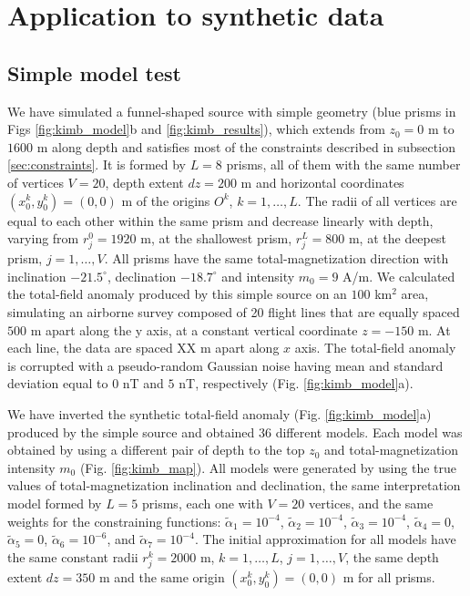 \section{Application to synthetic data}

\subsection{Simple model test}

We have simulated a funnel-shaped source with simple geometry (blue prisms in Figs \ref{fig:kimb_model}b and \ref{fig:kimb_results}), which extends from $z_0=0$ m to $1600$ m along depth and satisfies most of the constraints described in subsection \ref{sec:constraints}. It is formed by $L=8$ prisms, all of them with the same number of vertices $ V = 20 $, depth extent $ dz = 200 $ m and horizontal coordinates $ (x_0^k, y_0^k) = (0, 0) $ m of the origins $O^k$, $k=1,\dots,L$. The radii of all vertices are equal to each other within the same prism and decrease linearly with depth, varying from $r_j^0=1920$ m, at the shallowest prism, $r_j^L=800$ m, at the deepest prism, $j=1,\dots, V$. All prisms have the same total-magnetization direction with inclination $ -21.5^\circ $, declination $ -18.7^\circ $ and intensity $ m_0 = 9 $ A/m. We calculated the total-field anomaly produced by this simple source on an $ 100 $ km$^2$ area, simulating an airborne survey composed of 20 flight lines that are equally spaced $ 500 $ m apart along the y axis, at a constant vertical coordinate $ z = -150 $ m. At each line, the data are spaced XX m apart along $ x $ axis. The total-field anomaly is corrupted with a pseudo-random Gaussian noise having mean and standard deviation equal to $ 0 $ nT and $ 5 $ nT, respectively (Fig. \ref{fig:kimb_model}a).

We have inverted the synthetic total-field anomaly (Fig. \ref{fig:kimb_model}a) produced by the simple source and obtained 36 different models. Each model was obtained by using a different pair of depth to the top $ z_0 $ and total-magnetization intensity $ m_0 $ (Fig. \ref{fig:kimb_map}). All models were generated by using the true values of total-magnetization inclination and declination, the same interpretation model formed by $ L = 5 $ prisms, each one with $ V = 20 $ vertices, and the same weights for the constraining functions: $\tilde{\alpha}_1 = 10^{-4}$, $\tilde{\alpha}_2 = 10^{-4}$, $\tilde{\alpha}_3 = 10^{-4}$, $\tilde{\alpha}_4 = 0$, $\tilde{\alpha}_5 = 0$, $\tilde{\alpha}_6 = 10^{-6}$, and $\tilde{\alpha}_7 = 10^{-4}$. The initial approximation for all models have the same constant radii $ r^k_j = 2000 $ m, $ k = 1, \dots, L $, $ j  = 1, \dots, V $, the same depth extent $ dz = 350 $ m and the same origin $(x^k_0, y^k_0) = (0, 0) $ m for all prisms.

